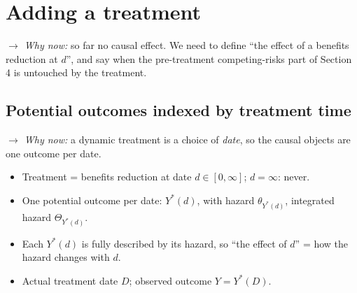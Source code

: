 \documentclass[11pt]{article}
\newcommand{\1}{\mathbf{1}}
\newcommand{\whynow}[1]{\par\noindent\textit{$\rightarrow$ Why now:} #1\par}
\begin{document}
\section{Adding a treatment}
\whynow{so far no causal effect. We need to define ``the effect of a benefits reduction at $d$'', and say when the pre-treatment competing-risks part of Section 4 is untouched by the treatment.}

\subsection{Potential outcomes indexed by treatment time}
\whynow{a dynamic treatment is a choice of \emph{date}, so the causal objects are one outcome per date.}
\begin{itemize}
  \item Treatment = benefits reduction at date $d\in[0,\infty]$; $d=\infty$: never.
  \item One potential outcome per date: $Y^*(d)$, with hazard $\theta_{Y^*(d)}$, integrated hazard $\Theta_{Y^*(d)}$.
  \item Each $Y^*(d)$ is fully described by its hazard, so ``the effect of $d$'' = how the hazard changes with $d$.
  \item Actual treatment date $D$; observed outcome $Y=Y^*(D)$.
\end{itemize}
\end{document}
